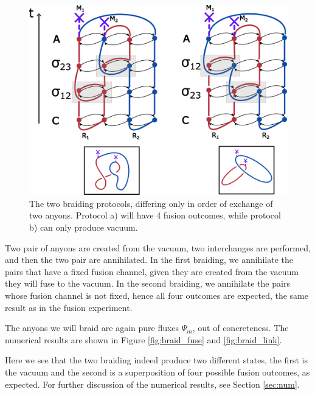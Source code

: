 \documentclass[two column]{article}
\begin{document}
\begin{figure}
    \centering
    \includegraphics[width=\linewidth]{Figures/fluxBRAID.pdf}
    \caption{The two braiding protocols, differing only in order of exchange of two anyons. Protocol a) will have 4 fusion outcomes, while protocol b) can only produce vacuum.}
    \label{fig:flux_braid}
\end{figure}

Two pair of anyons are created from the vacuum, two interchanges are performed, and then the two pair are annihilated. 
In the first braiding, we annihilate the pairs that have a fixed fusion channel, given they are created from the vacuum they will fuse to the vacuum.
In the second braiding, we annihilate the pairs whose fusion channel is not fixed, hence all four outcomes are expected, the same result as in the fusion experiment.

The anyons we will braid are again pure fluxes $\Psi_m$, out of concreteness. The numerical results are shown in Figure \ref{fig:braid_fuse} and \ref{fig:braid_link}.

Here we see that the two braiding indeed produce two different states, the first is the vacuum and the second is a superposition of four possible fusion outcomes, as expected.
For further discussion of the numerical results, see Section \ref{sec:num}.
\end{document}
